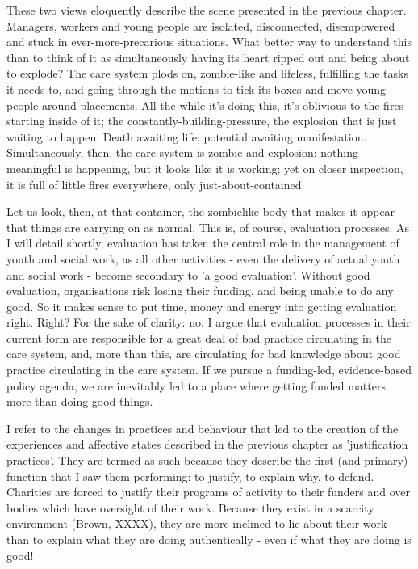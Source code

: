 These two views eloquently describe the scene presented in the previous chapter. Managers, workers and young people are isolated, disconnected, disempowered and stuck in ever-more-precarious situations. What better way to understand this than to think of it as simultaneously having its heart ripped out and being about to explode? The care system plods on, zombie-like and lifeless, fulfilling the tasks it needs to, and going through the motions to tick its boxes and move young people around placements. All the while it's doing this, it's oblivious to the fires starting inside of it; the constantly-building-pressure, the explosion that is just waiting to happen. Death awaiting life; potential awaiting manifestation. Simultaneously, then, the care system is zombie and explosion: nothing meaningful is happening, but it looks like it is working; yet on closer inspection, it is full of little fires everywhere, only just-about-contained.

Let us look, then, at that container, the zombielike body that makes it appear that things are carrying on as normal. This is, of course, evaluation processes. As I will detail shortly, evaluation has taken the central role in the management of youth and social work, as all other activities - even the delivery of actual youth and social work - become secondary to 'a good evaluation'. Without good evaluation, organisations risk losing their funding, and being unable to do any good. So it makes sense to put time, money and energy into getting evaluation right. Right? For the sake of clarity: no. I argue that evaluation processes in their current form are responsible for a great deal of bad practice circulating in the care system, and, more than this, are circulating for bad knowledge about good practice circulating in the care system. If we pursue a funding-led, evidence-based policy agenda, we are inevitably led to a place where getting funded matters more than doing good things.

I refer to the changes in practices and behaviour that led to the creation of the experiences and affective states described in the previous chapter as 'justification practices'. They are termed as such because they describe the first (and primary) function that I saw them performing: to justify, to explain why, to defend. Charities are forced to justify their programs of activity to their funders and over bodies which have oversight of their work. Because they exist in a scarcity environment (Brown, XXXX), they are more inclined to lie about their work than to explain what they are doing authentically - even if what they are doing is good!

